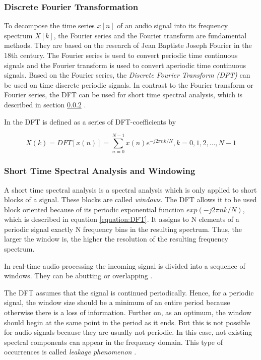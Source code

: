 \subsubsection{Discrete Fourier Transformation}

To decompose the time series $x[n]$ of an audio signal into its frequency spectrum $X[k]$, the Fourier series and the Fourier transform are fundamental methods. They are based on the research of Jean Baptiste Joseph Fourier in the 18th century. The Fourier series is used to convert periodic time continuous signals and the Fourier transform is used to convert aperiodic time continuous signals. Based on the Fourier series, the \textit{Discrete Fourier Transform (DFT)} can be used on time discrete periodic signals. In contrast to the Fourier transform or Fourier series, the DFT can be used for short time spectral analysis, which is described in section \ref{section:shortTime} \autocite[]{Werner:2012}.


In \autocite[]{Zoelzer:2002} the DFT is defined as a series of DFT-coefficients by

\begin{equation}
X(k)=DFT[x(n)]=\sum_{n=0}^{N-1}x(n)e^{-j2\pi nk/N}, k=0,1,2,...,N-1
\label{equation:DFT}
\end{equation}

\subsubsection{Short Time Spectral Analysis and Windowing} \label{section:shortTime}

A short time spectral analysis is a spectral analysis which is only applied to short blocks of a signal. These blocks are called \textit{windows}. The DFT allows it to be used block oriented because of its periodic exponential function $exp(-j2\pi nk/N)$, which is described in equation \ref{equation:DFT}. It assigns to N elements of a periodic signal exactly N frequency bins in the resulting spectrum. Thus, the larger the window is, the higher the resolution of the resulting frequency spectrum.

In real-time audio processing the incoming signal is divided into a sequence of windows. They can be abutting or overlapping \autocite[]{Werner:2012}.

The DFT assumes that the signal is continued periodically. Hence, for a periodic signal, the window size should be a minimum of an entire period because otherwise there is a loss of information. Further on, as an optimum, the window should begin at the same point in the period as it ends. But this is not possible for audio signals because they are usually not periodic. In this case, not existing spectral components can appear in the frequency domain. This type of occurrences is called \textit{leakage phenomenon} \autocite[]{Werner:2012}.


